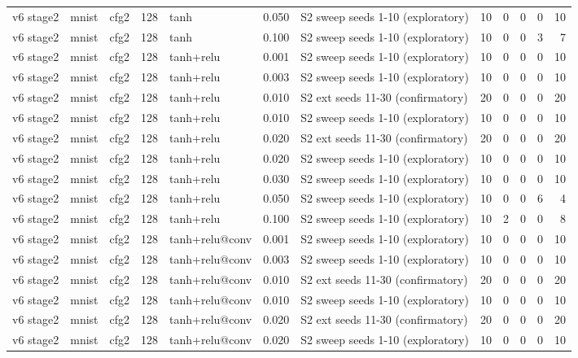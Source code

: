 \begin{table}[htbp]
{\begin{tabular}{@{}lllrlrlrrrrr@{}}
v6 stage2 & mnist & cfg2 & 128 & tanh & 0.050 & S2 sweep seeds 1-10 (exploratory) & 10 & 0 & 0 & 0 & 10 \\
v6 stage2 & mnist & cfg2 & 128 & tanh & 0.100 & S2 sweep seeds 1-10 (exploratory) & 10 & 0 & 0 & 3 & 7 \\
v6 stage2 & mnist & cfg2 & 128 & tanh+relu & 0.001 & S2 sweep seeds 1-10 (exploratory) & 10 & 0 & 0 & 0 & 10 \\
v6 stage2 & mnist & cfg2 & 128 & tanh+relu & 0.003 & S2 sweep seeds 1-10 (exploratory) & 10 & 0 & 0 & 0 & 10 \\
v6 stage2 & mnist & cfg2 & 128 & tanh+relu & 0.010 & S2 ext seeds 11-30 (confirmatory) & 20 & 0 & 0 & 0 & 20 \\
v6 stage2 & mnist & cfg2 & 128 & tanh+relu & 0.010 & S2 sweep seeds 1-10 (exploratory) & 10 & 0 & 0 & 0 & 10 \\
v6 stage2 & mnist & cfg2 & 128 & tanh+relu & 0.020 & S2 ext seeds 11-30 (confirmatory) & 20 & 0 & 0 & 0 & 20 \\
v6 stage2 & mnist & cfg2 & 128 & tanh+relu & 0.020 & S2 sweep seeds 1-10 (exploratory) & 10 & 0 & 0 & 0 & 10 \\
v6 stage2 & mnist & cfg2 & 128 & tanh+relu & 0.030 & S2 sweep seeds 1-10 (exploratory) & 10 & 0 & 0 & 0 & 10 \\
v6 stage2 & mnist & cfg2 & 128 & tanh+relu & 0.050 & S2 sweep seeds 1-10 (exploratory) & 10 & 0 & 0 & 6 & 4 \\
v6 stage2 & mnist & cfg2 & 128 & tanh+relu & 0.100 & S2 sweep seeds 1-10 (exploratory) & 10 & 2 & 0 & 0 & 8 \\
v6 stage2 & mnist & cfg2 & 128 & tanh+relu@conv & 0.001 & S2 sweep seeds 1-10 (exploratory) & 10 & 0 & 0 & 0 & 10 \\
v6 stage2 & mnist & cfg2 & 128 & tanh+relu@conv & 0.003 & S2 sweep seeds 1-10 (exploratory) & 10 & 0 & 0 & 0 & 10 \\
v6 stage2 & mnist & cfg2 & 128 & tanh+relu@conv & 0.010 & S2 ext seeds 11-30 (confirmatory) & 20 & 0 & 0 & 0 & 20 \\
v6 stage2 & mnist & cfg2 & 128 & tanh+relu@conv & 0.010 & S2 sweep seeds 1-10 (exploratory) & 10 & 0 & 0 & 0 & 10 \\
v6 stage2 & mnist & cfg2 & 128 & tanh+relu@conv & 0.020 & S2 ext seeds 11-30 (confirmatory) & 20 & 0 & 0 & 0 & 20 \\
v6 stage2 & mnist & cfg2 & 128 & tanh+relu@conv & 0.020 & S2 sweep seeds 1-10 (exploratory) & 10 & 0 & 0 & 0 & 10 \\

\end{tabular}}
\end{table}

